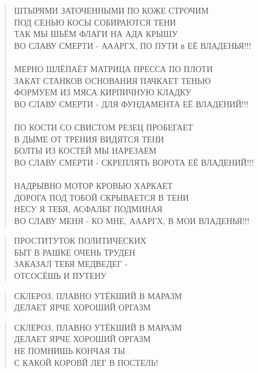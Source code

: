 \poemtitle{***}
\begin{verse}
ШТЫРЯМИ ЗАТОЧЕННЫМИ ПО КОЖЕ СТРОЧИМ\\
ПОД СЕНЬЮ КОСЫ СОБИРАЮТСЯ ТЕНИ\\
ТАК МЫ ШЬЁМ ФЛАГИ НА АДА КРЫШУ\\
    ВО СЛАВУ СМЕРТИ - АААРГХ, ПО ПУТИ в ЕЁ ВЛАДЕНЬЯ!!!\\
    \\
МЕРНО ШЛЁПАЁТ МАТРИЦА ПРЕССА ПО ПЛОТИ\\
ЗАКАТ СТАНКОВ ОСНОВАНИЯ ПАЧКАЕТ ТЕНЬЮ\\
ФОРМУЕМ ИЗ МЯСА КИРПИЧНУЮ КЛАДКУ\\
    ВО СЛАВУ СМЕРТИ - ДЛЯ ФУНДАМЕНТА ЕЁ ВЛАДЕНИЙ!!!\\
    \\
ПО КОСТИ СО СВИСТОМ РЕЗЕЦ ПРОБЕГАЕТ\\
В ДЫМЕ ОТ ТРЕНИЯ ВИДЯТСЯ ТЕНИ\\
БОЛТЫ ИЗ КОСТЕЙ МЫ НАРЕЗАЕМ\\
    ВО СЛАВУ СМЕРТИ - СКРЕПЛЯТЬ ВОРОТА ЕЁ ВЛАДЕНИЙ!!!\\
    \\
НАДРЫВНО МОТОР КРОВЬЮ ХАРКАЕТ\\
ДОРОГА ПОД ТОБОЙ СКРЫВАЕТСЯ В ТЕНИ\\
НЕСУ Я ТЕБЯ, АСФАЛЬТ ПОДМИНАЯ\\
    ВО СЛАВУ МЕНЯ - КО МНЕ, АААРГХ, В МОИ ВЛАДЕНЬЯ!!!
\end{verse}

\poemtitle{***}
\begin{verse}
ПРОСТИТУТОК ПОЛИТИЧЕСКИХ \\
БЫТ В РАШКЕ ОЧЕНЬ ТРУДЕН\\
ЗАКАЗАЛ ТЕБЯ МЕДВЕДЕГ - \\
ОТСОСЁШЬ И ПУТЕНУ
\end{verse}

\poemtitle{***}
\begin{verse}
СКЛЕРОЗ, ПЛАВНО УТЁКШИЙ В МАРАЗМ\\
ДЕЛАЕТ ЯРЧЕ ХОРОШИЙ ОРГАЗМ
\end{verse}

\poemtitle{***}
\begin{verse}
СКЛЕРОЗ, ПЛАВНО УТЁКШИЙ В МАРАЗМ\\
ДЕЛАЕТ ЯРЧЕ ХОРОШИЙ ОРГАЗМ\\
НЕ ПОМНИШЬ КОНЧАЯ ТЫ\\
С КАКОЙ КОРОВЙ ЛЕГ В ПОСТЕЛЬ!
\end{verse}

